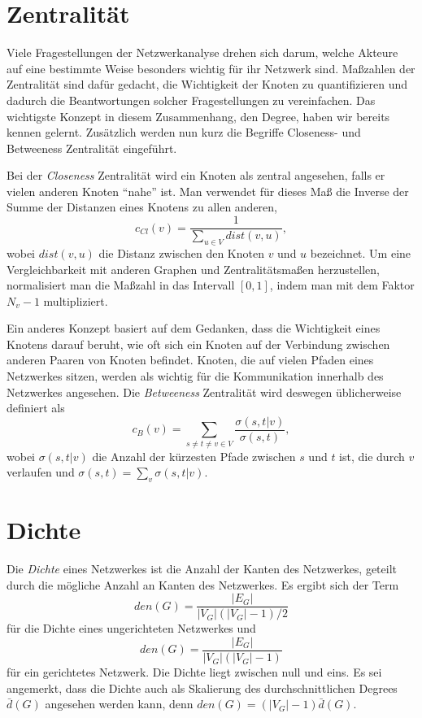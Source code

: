 \documentclass[a4paper,ngerman,oneside,titlepage,bibliography=totoc,11pt]{scrreprt}
\begin{document}
\section{Zentralität}
Viele Fragestellungen der Netzwerkanalyse drehen sich darum, welche Akteure auf eine bestimmte Weise besonders wichtig für ihr Netzwerk sind. Maßzahlen der Zentralität sind dafür gedacht, die Wichtigkeit der Knoten zu quantifizieren und dadurch die Beantwortungen solcher Fragestellungen zu vereinfachen. Das wichtigste Konzept in diesem Zusammenhang, den Degree, haben wir bereits kennen gelernt. Zusätzlich werden nun kurz die Begriffe Closeness- und Betweeness Zentralität eingeführt.

Bei der \emph{Closeness} Zentralität wird ein Knoten als zentral angesehen, falls er vielen anderen Knoten "`nahe"' ist.
Man verwendet für dieses Maß die Inverse der Summe der Distanzen eines Knotens zu allen anderen,
$$ c_{Cl}(v)=\frac{1}{\sum_{u \in V}{dist(v,u)}}, $$
wobei $dist(v,u)$ die Distanz zwischen den Knoten $v$ und $u$ bezeichnet. Um eine Vergleichbarkeit mit anderen Graphen und Zentralitätsmaßen herzustellen, normalisiert man die Maßzahl in das Intervall $[0,1]$, indem man mit dem Faktor $N_v - 1$ multipliziert.

Ein anderes Konzept basiert auf dem Gedanken, dass die Wichtigkeit eines Knotens darauf beruht, wie oft sich ein Knoten auf der Verbindung zwischen anderen Paaren von Knoten befindet. Knoten, die auf vielen Pfaden eines Netzwerkes sitzen, werden als wichtig für die Kommunikation innerhalb des Netzwerkes angesehen. 
Die \emph{Betweeness} Zentralität wird deswegen üblicherweise definiert als
$$ c_{B}(v)= \sum_{s \neq t \neq v \in V} {\frac{\sigma(s,t|v)}{\sigma(s,t)}}, $$
wobei $\sigma(s,t|v)$ die Anzahl der kürzesten Pfade zwischen $s$ und $t$ ist, die durch $v$ verlaufen und $\sigma(s,t) = \sum_v{\sigma(s,t|v)}$.

\section{Dichte}
Die \emph{Dichte} eines Netzwerkes ist die Anzahl der Kanten des Netzwerkes, geteilt durch die mögliche Anzahl an Kanten des Netzwerkes. Es ergibt sich der Term $$den(G) = \frac{|E_G|}{|V_G|(|V_G|-1)/2}$$ für die Dichte eines ungerichteten Netzwerkes und $$den(G) = \frac{|E_G|}{|V_G|(|V_G|-1)}$$ für ein gerichtetes Netzwerk. Die Dichte liegt zwischen null und eins. Es sei angemerkt, dass die Dichte auch als Skalierung des durchschnittlichen Degrees $\bar{d}(G)$ angesehen werden kann, denn $den(G) = (|V_G| - 1) \bar{d}(G)$.
\end{document}
